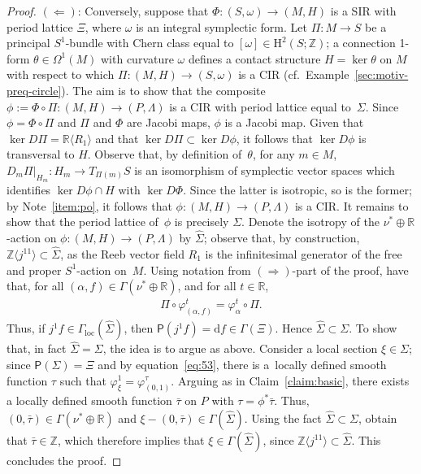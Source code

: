 \documentclass[pdftex]{sigma}
\numberwithin{equation}{section}
\newcommand{\de}{\mathrm{d}} %
\newcommand{\CM}{(M,H)} %
\newcommand{\SM}{(S,\omega)} %
\newcommand{\PM}{(P,\Lambda)} %
\newcommand{\HH}{\mathrm{H}}
\newcommand{\RR}{\mathbb{R}}
\newcommand{\ZZ}{\mathbb{Z}}
\begin{document}
\begin{proof}
\underline{$(\Leftarrow)$}: Conversely, suppose that $\Phi \colon \SM \to \CM$ is a SIR with period lattice $\Xi$, where $\omega$ is an integral symplectic form. Let $\Pi \colon M \to S$ be a principal $S^1$-bundle with Chern class equal to $[\omega] \in \HH^2(S;\ZZ)$; a connection 1-form $\theta \in \Omega^1(M)$ with curvature $\omega$ def\/ines a contact structure $H=\ker \theta$ on $M$ with respect to which $\Pi \colon \CM \to \SM$ is a CIR (cf.\ Example~\ref{sec:motiv-preq-circle}). The aim is to show that the composite $\phi:= \Phi \circ \Pi \colon \CM \to \PM$ is a CIR with period lattice equal to~$\Sigma$. Since $\phi = \Phi \circ \Pi$ and $\Pi$ and $\Phi$ are Jacobi maps, $\phi$ is a Jacobi map. Given that $\ker D \Pi = \RR\langle R_1\rangle$ and that $\ker D \Pi \subset \ker D \phi$, it follows that $\ker D \phi$ is transversal to $H$. Observe that, by def\/inition of~$\theta$, for any $m \in M$, $D_m \Pi|_{H_m}\colon H_m \to T_{\Pi(m)}S$ is an isomorphism of symplectic vector spaces which identif\/ies $\ker D\phi \cap H$ with $\ker D\Phi$. Since the latter is isotropic, so is the former; by Note~\ref{item:po}, it follows that $\phi \colon \CM \to \PM$ is a CIR. It remains to show that the period lattice of~$\phi$ is precisely $\Sigma$. Denote the isotropy of the $\nu^* \oplus \RR$-action on $\phi \colon \CM \to \PM$ by $\hat{\Sigma}$; observe that, by construction, $\ZZ\langle j^11\rangle \subset \hat{\Sigma}$, as the Reeb vector f\/ield $R_1$ is the inf\/initesimal generator of the free and proper $S^1$-action on~$M$. Using notation from $(\Rightarrow)$-part of the proof, have that, for all $(\alpha,f) \in \Gamma(\nu^* \oplus \RR)$, and for all $t \in \RR$,
 \begin{gather} \label{eq:53}
 \Pi \circ \varphi^t_{(\alpha,f)} = \varphi^t_{\alpha} \circ \Pi.
 \end{gather}
Thus, if $j^1f \in \Gamma_{\mathrm{loc}}(\hat{\Sigma})$, then $\mathsf{P}(j^1f) = \de f \in \Gamma(\Xi)$. Hence $\hat{\Sigma} \subset \Sigma$. To show that, in fact $\hat{\Sigma} = \Sigma$, the idea is to argue as above. Consider a local section $\xi \in \Sigma$; since $\mathsf{P}(\Sigma) = \Xi$ and by equation~\eqref{eq:53}, there is a~locally def\/ined smooth function $\tau$ such that $\varphi^1_{\xi} = \varphi^{\tau}_{(0,1)}$. Arguing as in Claim~\ref{claim:basic}, there exists a locally def\/ined smooth function $\bar{\tau}$ on $P$ with $\tau = \phi^*\bar{\tau}$. Thus, $(0,\bar{\tau}) \in \Gamma(\nu^* \oplus \RR)$ and $\xi - (0,\bar{\tau}) \in \Gamma(\hat{\Sigma})$. Using the fact $\hat{\Sigma} \subset \Sigma$, obtain that $\bar{\tau} \in \ZZ$, which therefore implies that $\xi \in \Gamma(\hat{\Sigma})$, since $\ZZ\langle j^11\rangle \subset \hat{\Sigma}$. This concludes the proof.
\end{proof}
\end{document}
